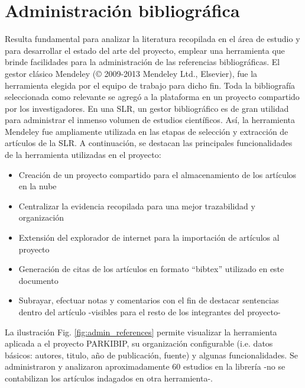 
\section{Administración bibliográfica}

Resulta fundamental para analizar la literatura recopilada en el área de estudio y para desarrollar el estado del arte del proyecto, emplear una herramienta que brinde facilidades para la administración de las referencias bibliográficas. El gestor clásico Mendeley (© 2009-2013 Mendeley Ltd., Elsevier), fue la herramienta elegida por el equipo de trabajo para dicho fin. Toda la bibliografía seleccionada como relevante se agregó a la plataforma en un proyecto compartido por los investigadores. 
En una SLR, un gestor bibliográfico es de gran utilidad para administrar el inmenso volumen de estudios científicos. Así, la herramienta Mendeley fue ampliamente utilizada en las etapas de selección y extracción de artículos de la SLR. A continuación, se destacan las principales funcionalidades de la herramienta utilizadas en el proyecto: 

\begin{itemize}
    \item Creación de un proyecto compartido para el almacenamiento de los artículos en la nube
    \item Centralizar la evidencia recopilada para una mejor trazabilidad y organización
    \item Extensión del explorador de internet para la importación de artículos al proyecto
    \item Generación de citas de los artículos en formato ``bibtex'' utilizado en este documento 
    \item Subrayar, efectuar notas y comentarios con el fin de destacar sentencias dentro del artículo -visibles para el resto de los integrantes del proyecto- 
\end{itemize}

La ilustración Fig. \ref{fig:admin_references} permite visualizar la herramienta aplicada a el proyecto PARKIBIP, su organización configurable (i.e. datos básicos: autores, titulo, año de publicación, fuente) y algunas funcionalidades. Se administraron y analizaron aproximadamente 60 estudios en la librería -no se contabilizan los artículos indagados en otra herramienta-.

